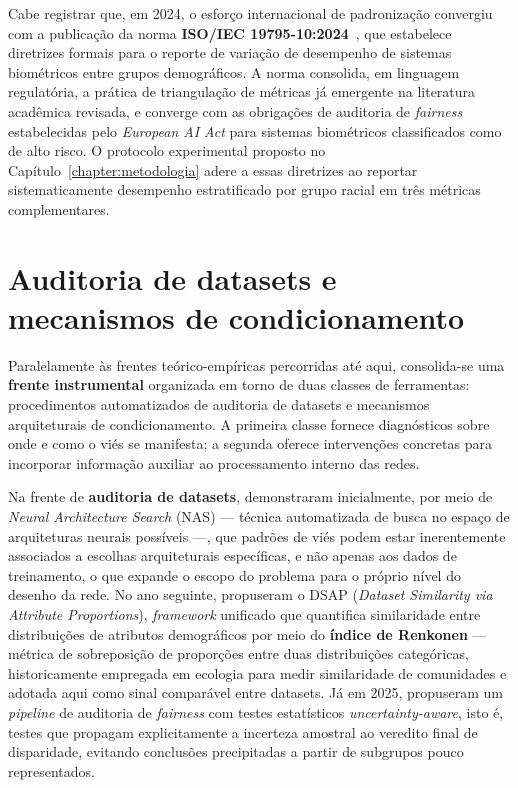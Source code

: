 Cabe registrar que, em 2024, o esforço internacional de padronização convergiu com a publicação da norma \textbf{ISO/IEC 19795-10:2024}~\cite{iso2024biometric}, que estabelece diretrizes formais para o reporte de variação de desempenho de sistemas biométricos entre grupos demográficos. A norma consolida, em linguagem regulatória, a prática de triangulação de métricas já emergente na literatura acadêmica revisada, e converge com as obrigações de auditoria de \emph{fairness} estabelecidas pelo \emph{European AI Act} para sistemas biométricos classificados como de alto risco. O protocolo experimental proposto no Capítulo~\ref{chapter:metodologia} adere a essas diretrizes ao reportar sistematicamente desempenho estratificado por grupo racial em três métricas complementares.

\section{Auditoria de datasets e mecanismos de condicionamento}
\label{sec:rl_arquit}

Paralelamente às frentes teórico-empíricas percorridas até aqui, consolida-se uma \textbf{frente instrumental} organizada em torno de duas classes de ferramentas: procedimentos automatizados de auditoria de datasets e mecanismos arquiteturais de condicionamento. A primeira classe fornece diagnósticos sobre onde e como o viés se manifesta; a segunda oferece intervenções concretas para incorporar informação auxiliar ao processamento interno das redes.

Na frente de \textbf{auditoria de datasets},  demonstraram inicialmente, por meio de \emph{Neural Architecture Search} (NAS) --- técnica automatizada de busca no espaço de arquiteturas neurais possíveis ---, que padrões de viés podem estar inerentemente associados a escolhas arquiteturais específicas, e não apenas aos dados de treinamento, o que expande o escopo do problema para o próprio nível do desenho da rede. No ano seguinte,  propuseram o DSAP (\emph{Dataset Similarity via Attribute Proportions}), \emph{framework} unificado que quantifica similaridade entre distribuições de atributos demográficos por meio do \textbf{índice de Renkonen} --- métrica de sobreposição de proporções entre duas distribuições categóricas, historicamente empregada em ecologia para medir similaridade de comunidades e adotada aqui como sinal comparável entre datasets. Já em 2025,  propuseram um \emph{pipeline} de auditoria de \emph{fairness} com testes estatísticos \emph{uncertainty-aware}, isto é, testes que propagam explicitamente a incerteza amostral ao veredito final de disparidade, evitando conclusões precipitadas a partir de subgrupos pouco representados.

